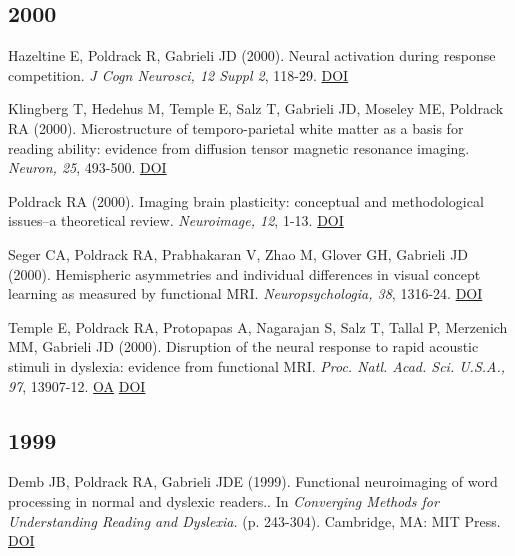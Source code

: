 \subsection*{2000}

Hazeltine E, Poldrack R, Gabrieli JD (2000). Neural activation during response competition. \textit{J Cogn Neurosci, 12 Suppl 2}, 118-29. \href{http://dx.doi.org/10.1162/089892900563984}{DOI} \vspace{2mm}

Klingberg T, Hedehus M, Temple E, Salz T, Gabrieli JD, Moseley ME, Poldrack RA (2000). Microstructure of temporo-parietal white matter as a basis for reading ability: evidence from diffusion tensor magnetic resonance imaging. \textit{Neuron, 25}, 493-500. \href{http://dx.doi.org/10.1016/s0896-6273(00)80911-3}{DOI} \vspace{2mm}

Poldrack RA (2000). Imaging brain plasticity: conceptual and methodological issues--a theoretical review. \textit{Neuroimage, 12}, 1-13. \href{http://dx.doi.org/10.1006/nimg.2000.0596}{DOI} \vspace{2mm}

Seger CA, Poldrack RA, Prabhakaran V, Zhao M, Glover GH, Gabrieli JD (2000). Hemispheric asymmetries and individual differences in visual concept learning as measured by functional MRI. \textit{Neuropsychologia, 38}, 1316-24. \href{http://dx.doi.org/10.1016/s0028-3932(00)00014-2}{DOI} \vspace{2mm}

Temple E, Poldrack RA, Protopapas A, Nagarajan S, Salz T, Tallal P, Merzenich MM, Gabrieli JD (2000). Disruption of the neural response to rapid acoustic stimuli in dyslexia: evidence from functional MRI. \textit{Proc. Natl. Acad. Sci. U.S.A., 97}, 13907-12. \href{https://www.ncbi.nlm.nih.gov/pmc/articles/PMC17674}{OA} \href{http://dx.doi.org/10.1073/pnas.240461697}{DOI} \vspace{2mm}

\subsection*{1999}

Demb JB, Poldrack RA, Gabrieli JDE (1999). Functional neuroimaging of word processing in normal and dyslexic readers.. In \textit{Converging Methods for Understanding Reading and Dyslexia.} (p. 243-304). Cambridge, MA: MIT Press. \href{http://dx.doi.org/9780262519250}{DOI} \vspace{2mm}

